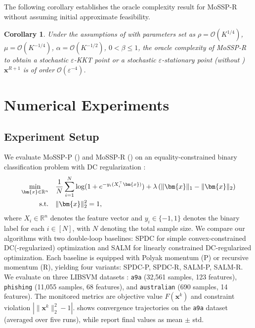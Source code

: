 \documentclass{article}
\theoremstyle{plain}
\newtheorem{corollary}{Corollary}[section]
\theoremstyle{definition}
\theoremstyle{remark}
\newcommand{\RR}{\mathbb{R}}
\newcommand{\bx}{\bm{x}}
\newcommand{\calO}{\mathcal{O}}
\numberwithin{equation}{section}
\begin{document}
The following corollary establishes the oracle complexity result for MoSSP-R without assuming initial approximate feasibility.
\begin{corollary}
    \label{Theorem: the basic convergence rate of storm without initial feasibility}
    Under the assumptions of  with parameters set as $\rho = \calO(K^{1/4})$, $\mu = \calO(K^{-1/4})$, $\alpha = \calO(K^{-1/2})$, $0 < \beta \leq 1$, the oracle complexity of MoSSP-R to obtain a stochastic $\varepsilon$-KKT point or a stochastic $\varepsilon$-stationary point (without ) $\bx^{R+1}$ is of order $\calO(\varepsilon^{-4})$.
\end{corollary}

\section{Numerical Experiments}
\label{Section: Numerical experiments}
\subsection{Experiment Setup}
We evaluate MoSSP-P () and MoSSP-R () on an equality-constrained binary classification problem with DC regularization \cite{hong2023constrained}:
\begin{align}
\label{eq.libsvm}
\min_{\bx \in \RR^n}&\quad
\frac{1}{N} \sum_{i=1}^N \log(1 + e^{-y_i (X_i^\top \bx)}) + \lambda \left( \|\bx\|_1 - \|\bx\|_2 \right) \notag \\
 \text{s.t.} &\quad \|\bx\|_2^2 = 1,
\end{align}
where \( X_i \in \RR^n \) denotes the feature vector and \( y_i \in \{-1, 1\} \) denotes the binary label for each \( i \in [N] \), with \(N\) denoting the total sample size. We compare our algorithms with two double-loop baselines: SPDC \cite{xu2019stochastic,nitanda2017stochastic} for simple convex-constrained DC(-regularized) optimization and SALM \cite{sun2023algorithms} for linearly constrained DC-regularized optimization. Each baseline is equipped with Polyak momentum (P) or recursive momentum (R), yielding four variants: SPDC-P, SPDC-R, SALM-P, SALM-R. We evaluate on three LIBSVM datasets \cite{chang2011libsvm}: \texttt{a9a} (32,561 samples, 123 features), \texttt{phishing} (11,055 samples, 68 features), and \texttt{australian} (690 samples, 14 features). The monitored metrics are objective value $F(\bx^k)$ and constraint violation $|\|\bx^k\|_2^2 - 1|$.  shows convergence trajectories on the \texttt{a9a} dataset (averaged over five runs), while  report final values as mean $\pm$ std.
\end{document}

